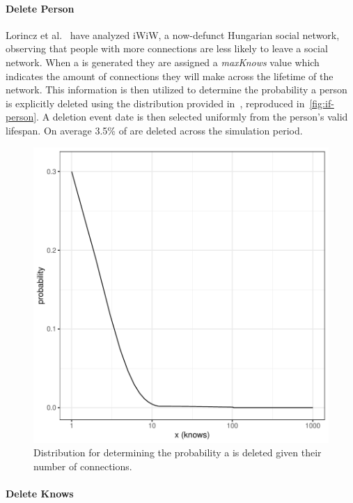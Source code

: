 \paragraph{Delete Person}

Lorincz et al.~\cite{Lorincz2019} have analyzed iWiW, a now-defunct Hungarian social network, observing that people with more connections are less likely to leave a social network.
When a \tPerson is generated they are assigned a \emph{maxKnows} value which indicates the amount of \tKnows connections they
will make across the lifetime of the network.
This information is then utilized to determine the probability a person is explicitly deleted using the distribution provided
in~\cite{Lorincz2019}, reproduced in~\autoref{fig:if-person}.
A deletion event date is then selected uniformly from the person's valid lifespan.
On average 3.5\% of \tPersons are deleted across the simulation period.

\begin{figure}[H]
  \centering
  \includegraphics[scale=\yedscale]{figures/fig-if-person}
  \caption{Distribution for determining the probability a \tPerson is deleted given their number of connections.}
  \label{fig:if-person}
\end{figure}

\paragraph{Delete Knows}

